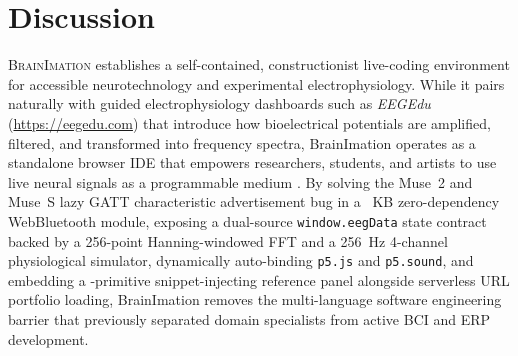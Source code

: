 \documentclass[10pt,twocolumn]{article}
\begin{document}
\section{Discussion}
\textsc{BrainImation} establishes a self-contained, constructionist live-coding environment for accessible neurotechnology and experimental electrophysiology. While it pairs naturally with guided electrophysiology dashboards such as \emph{EEGEdu} (\url{https://eegedu.com}) \citep{mathewson2026eegedu} that introduce how bioelectrical potentials are amplified, filtered, and transformed into frequency spectra, BrainImation operates as a standalone browser IDE that empowers researchers, students, and artists to use live neural signals as a programmable medium \citep{papert1980mindstorms,resnick2009scratch,deleeuw2015jspsych}. By solving the Muse~2 and Muse~S lazy GATT characteristic advertisement bug in a \MuseBrowserKB~KB zero-dependency WebBluetooth module, exposing a dual-source \texttt{window.eegData} state contract backed by a 256-point Hanning-windowed FFT and a 256~Hz 4-channel physiological simulator, dynamically auto-binding \texttt{p5.js} and \texttt{p5.sound}, and embedding a \NRefAPIs-primitive snippet-injecting reference panel alongside serverless URL portfolio loading, BrainImation removes the multi-language software engineering barrier that previously separated domain specialists from active BCI and ERP development.
\end{document}
